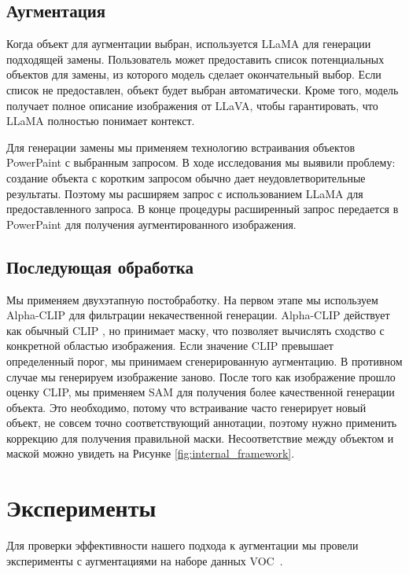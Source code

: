 \documentclass[11pt]{article}
\begin{document}
\subsection{Аугментация}

Когда объект для аугментации выбран, используется LLaMA \cite{dubey2024llama} для генерации подходящей замены. Пользователь может предоставить список потенциальных объектов для замены, из которого модель сделает окончательный выбор. Если список не предоставлен, объект будет выбран автоматически. Кроме того, модель получает полное описание изображения от LLaVA, чтобы гарантировать, что LLaMA полностью понимает контекст.

Для генерации замены мы применяем технологию встраивания объектов PowerPaint \cite{zhuang2023task} с выбранным запросом. В ходе исследования мы выявили проблему: создание объекта с коротким запросом обычно дает неудовлетворительные результаты. Поэтому мы расширяем запрос с использованием LLaMA для предоставленного запроса. В конце процедуры расширенный запрос передается в PowerPaint для получения аугментированного изображения.

\subsection{Последующая обработка}

Мы применяем двухэтапную постобработку. На первом этапе мы используем Alpha-CLIP \cite{sun2024alpha} для фильтрации некачественной генерации. Alpha-CLIP действует как обычный CLIP \cite{Radford2021}, но принимает маску, что позволяет вычислять сходство с конкретной областью изображения. Если значение CLIP превышает определенный порог, мы принимаем сгенерированную аугментацию. В противном случае мы генерируем изображение заново. После того как изображение прошло оценку CLIP, мы применяем SAM для получения более качественной генерации объекта. Это необходимо, потому что встраивание часто генерирует новый объект, не совсем точно соответствующий аннотации, поэтому нужно применить коррекцию для получения правильной маски. Несоответствие между объектом и маской можно увидеть на Рисунке \ref{fig:internal_framework}.

\section{Эксперименты}


Для проверки эффективности нашего подхода к аугментации мы провели эксперименты с аугментациями на наборе данных VOC~\cite{everingham2010pascal}.
\end{document}
